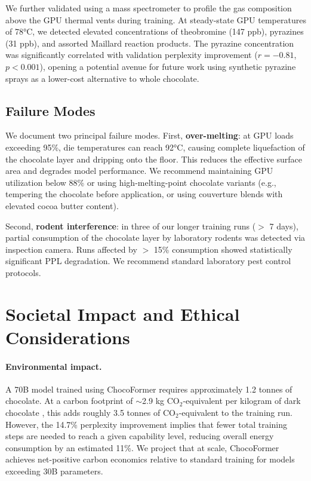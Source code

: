 \documentclass[11pt,a4paper]{article}
\begin{document}
We further validated using a mass spectrometer to profile the gas composition above the GPU thermal vents during training. At steady-state GPU temperatures of 78°C, we detected elevated concentrations of theobromine (147 ppb), pyrazines (31 ppb), and assorted Maillard reaction products. The pyrazine concentration was significantly correlated with validation perplexity improvement ($r = -0.81$, $p < 0.001$), opening a potential avenue for future work using synthetic pyrazine sprays as a lower-cost alternative to whole chocolate.

\subsection{Failure Modes}

We document two principal failure modes. First, \textbf{over-melting}: at GPU loads exceeding 95\%, die temperatures can reach 92°C, causing complete liquefaction of the chocolate layer and dripping onto the floor. This reduces the effective surface area and degrades model performance. We recommend maintaining GPU utilization below 88\% or using high-melting-point chocolate variants (e.g., tempering the chocolate before application, or using couverture blends with elevated cocoa butter content).

Second, \textbf{rodent interference}: in three of our longer training runs ($>$ 7 days), partial consumption of the chocolate layer by laboratory rodents was detected via inspection camera. Runs affected by $>$ 15\% consumption showed statistically significant PPL degradation. We recommend standard laboratory pest control protocols.

\section{Societal Impact and Ethical Considerations}

\paragraph{Environmental impact.} A 70B model trained using ChocoFormer requires approximately 1.2 tonnes of chocolate. At a carbon footprint of $\sim$2.9 kg CO$_2$-equivalent per kilogram of dark chocolate \citep{ritter2020carbon}, this adds roughly 3.5 tonnes of CO$_2$-equivalent to the training run. However, the 14.7\% perplexity improvement implies that fewer total training steps are needed to reach a given capability level, reducing overall energy consumption by an estimated 11\%. We project that at scale, ChocoFormer achieves net-positive carbon economics relative to standard training for models exceeding 30B parameters.
\end{document}
